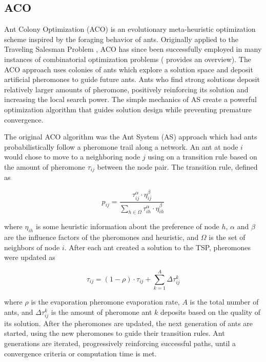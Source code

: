 \documentclass[preprint,12pt]{elsarticle}
\begin{document}
\subsection{ACO} \label{sec:ACO}
Ant Colony Optimization (ACO) is an evolutionary meta-heuristic optimization scheme inspired by the foraging behavior of ants. Originally applied to the Traveling Salesman Problem \citep{Dorigo1996}, ACO has since been successfully employed in many instances of combinatorial optimization problems (\cite{Dorigo1999} provides an overview). The ACO approach uses colonies of ants which explore a solution space and deposit artificial pheromones to guide future ants. Ants who find strong solutions deposit relatively larger amounts of pheromone, positively reinforcing its solution and increasing the local search power. The simple mechanics of AS create a powerful optimization algorithm that guides solution design while preventing premature convergence. 

The original ACO algorithm was the Ant System (AS) approach \citep{Dorigo1996} which had ants probabilistically follow a pheromone trail along a network. An ant at node $i$ would chose to move to a neighboring node $j$ using on a transition rule based on the amount of pheromone $\tau_{ij}$ between the node pair. The transition rule, defined as 

\begin{equation}
p_{ij}=\frac{\tau_{ij}^\alpha\cdot\eta_{ij}^\beta}{\sum_{h\in\Omega}
	\tau_{ih}^\alpha\cdot\eta_{ih}^\beta}
\label{eq:AStrans}
\end{equation}

\noindent where $\eta_{ih}$ is some heuristic information about the preference of node $h$, $\alpha$ and $\beta$ are the influence factors of the pheromones and heuristic, and $\Omega$ is the set of neighbors of node $i$. After each ant created a solution to the TSP, pheromones were updated as

\begin{equation}
\tau_{ij}=(1-\rho)\cdot\tau_{ij}+\sum_{k=1}^{A}
\Delta\tau_{ij}^k
\label{eq:ASup}
\end{equation}

\noindent where $\rho$ is the evaporation pheromone evaporation rate, $A$ is the total number of ants, and $\Delta\tau_{ij}^k$ is the amount of pheromone ant $k$ deposits based on the quality of its solution. After the pheromones are updated, the next generation of ants are started, using the new pheromones to guide their transition rules. Ant generations are iterated, progressively reinforcing successful paths, until a convergence criteria or computation time is met.
\end{document}
